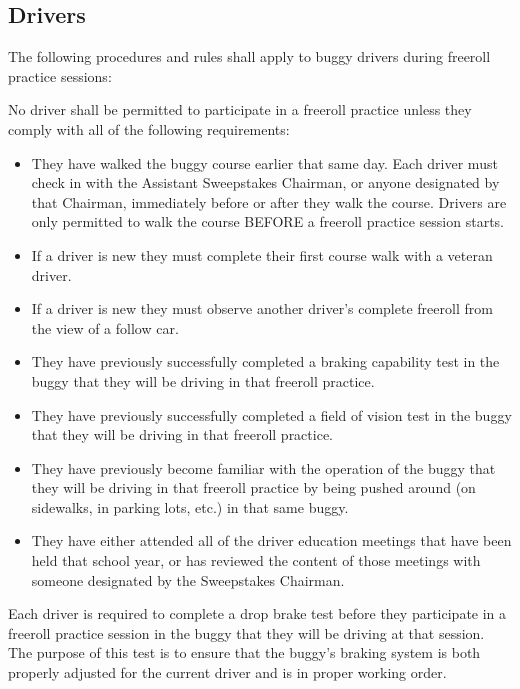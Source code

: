 \subsection{Drivers}

	The following procedures and rules shall apply to buggy drivers during freeroll practice sessions:
	\newline

	\noindent No driver shall be permitted to participate in a freeroll practice unless they comply with all of the following requirements:

	\begin{itemize}

		\item
		They have walked the buggy course earlier that same day. Each driver must check in with the Assistant Sweepstakes Chairman, or anyone designated by that Chairman, immediately before or after they walk the course. Drivers are only permitted to walk the course BEFORE a freeroll practice session starts.

		\item		
		If a driver is new they must complete their first course walk with a veteran driver. 

		\item
		If a driver is new they must observe another driver's complete freeroll from the view of a follow car.

		\item
		They have previously successfully completed a braking capability test in the buggy that they will be driving in that freeroll practice.

		\item
		They have previously successfully completed a field of vision test in the buggy that they will be driving in that freeroll practice.

		\item
		They have previously become familiar with the operation of the buggy that they will be driving in that freeroll practice by being pushed around (on sidewalks, in parking lots, etc.) in that same buggy.

		\item
		They have either attended all of the driver education meetings that have been held that school year, or has reviewed the content of those meetings with someone designated by the Sweepstakes Chairman.

	\end{itemize}
	
	Each driver is required to complete a drop brake test before they participate in a freeroll practice session in the buggy that they will be driving at that session. The purpose of this test is to ensure that the buggy's braking system is both properly adjusted for the current driver and is in proper working order.
	
